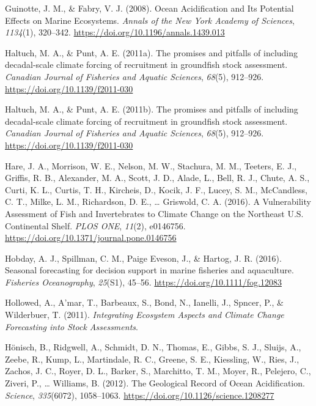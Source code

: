 \documentclass[
  12pt,
]{article}
\newlength{\cslhangindent}
\newenvironment{CSLReferences}[2] %
 {\begin{list}{}{%
  \setlength{\itemindent}{0pt}
  \setlength{\leftmargin}{0pt}
  \setlength{\parsep}{0pt}
  \ifodd #1
   \setlength{\leftmargin}{\cslhangindent}
   \setlength{\itemindent}{-1\cslhangindent}
  \fi
  \setlength{\itemsep}{#2\baselineskip}}}
 {\end{list}}
\begin{document}
\begin{CSLReferences}{1}{2}
Guinotte, J. M., \& Fabry, V. J. (2008). Ocean Acidification and Its Potential Effects on Marine Ecosystems. \emph{Annals of the New York Academy of Sciences}, \emph{1134}(1), 320--342. \url{https://doi.org/10.1196/annals.1439.013}

Haltuch, M. A., \& Punt, A. E. (2011a). The promises and pitfalls of including decadal-scale climate forcing of recruitment in groundfish stock assessment. \emph{Canadian Journal of Fisheries and Aquatic Sciences}, \emph{68}(5), 912--926. \url{https://doi.org/10.1139/f2011-030}

Haltuch, M. A., \& Punt, A. E. (2011b). The promises and pitfalls of including decadal-scale climate forcing of recruitment in groundfish stock assessment. \emph{Canadian Journal of Fisheries and Aquatic Sciences}, \emph{68}(5), 912--926. \url{https://doi.org/10.1139/f2011-030}

Hare, J. A., Morrison, W. E., Nelson, M. W., Stachura, M. M., Teeters, E. J., Griffis, R. B., Alexander, M. A., Scott, J. D., Alade, L., Bell, R. J., Chute, A. S., Curti, K. L., Curtis, T. H., Kircheis, D., Kocik, J. F., Lucey, S. M., McCandless, C. T., Milke, L. M., Richardson, D. E., \ldots{} Griswold, C. A. (2016). A Vulnerability Assessment of Fish and Invertebrates to Climate Change on the Northeast U.S. Continental Shelf. \emph{PLOS ONE}, \emph{11}(2), e0146756. \url{https://doi.org/10.1371/journal.pone.0146756}

Hobday, A. J., Spillman, C. M., Paige Eveson, J., \& Hartog, J. R. (2016). Seasonal forecasting for decision support in marine fisheries and aquaculture. \emph{Fisheries Oceanography}, \emph{25}(S1), 45--56. \url{https://doi.org/10.1111/fog.12083}

Hollowed, A., A'mar, T., Barbeaux, S., Bond, N., Ianelli, J., Spncer, P., \& Wilderbuer, T. (2011). \emph{Integrating Ecosystem Aspects and Climate Change Forecasting into Stock Assessments}.

Hönisch, B., Ridgwell, A., Schmidt, D. N., Thomas, E., Gibbs, S. J., Sluijs, A., Zeebe, R., Kump, L., Martindale, R. C., Greene, S. E., Kiessling, W., Ries, J., Zachos, J. C., Royer, D. L., Barker, S., Marchitto, T. M., Moyer, R., Pelejero, C., Ziveri, P., \ldots{} Williams, B. (2012). The {Geological Record} of {Ocean Acidification}. \emph{Science}, \emph{335}(6072), 1058--1063. \url{https://doi.org/10.1126/science.1208277}


\end{CSLReferences}
\end{document}
